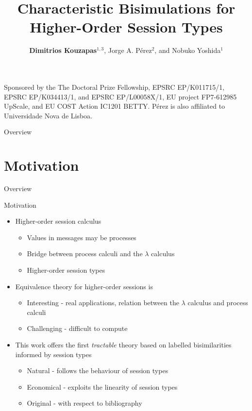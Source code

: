 \documentclass{beamer}
\title{Characteristic Bisimulations for Higher-Order Session Types}
\author{{\bf Dimitrios Kouzapas$^{1,3}$}, Jorge A. P\'{e}rez$^{2}$, and Nobuko Yoshida$^1$}
\institute{Imperial College London$^1$, University of Groningen$^2$, University of Glasgow$^3$}
\date
\newcommand{\currentsection}{
	\begin{frame}{Overview}
		\tableofcontents[currentsection]
	\end{frame}
}
\begin{document}
	\begin{frame}
		\titlepage

		{ \tiny %
		Sponsored by the The Doctoral Prize Fellowship, EPSRC EP/K011715/1,
		EPSRC EP/K034413/1, and EPSRC EP/L00058X/1,
		EU project FP7-612985 UpScale, and EU COST Action IC1201 BETTY.  
		P\'{e}rez is  also affiliated to
		Universidade Nova de Lisboa.%
		}
	\end{frame}

	\begin{frame}{Overview}
		\tableofcontents
	\end{frame}

	\section{Motivation}

	\currentsection

	\begin{frame}{Motivation}
		\begin{itemize}
			\item	Higher-order session calculus

				\begin{itemize}
					\item	Values in messages may be processes
					\item	Bridge between process calculi and the $\lambda$ calculus
					\item	Higher-order session types
				\end{itemize}


			\item	Equivalence theory for higher-order sessions is
				\begin{itemize}
					\item	Interesting - real applications, relation between the $\lambda$ calculus and process calculi
					\item	Challenging - difficult to compute
				\end{itemize}

			\item	This work offers the first {\em tractable} theory based on labelled bisimilarities
				informed by session types %
				\begin{itemize}
					\item	Natural - follows the behaviour of session types
					\item	Economical - exploits the linearity of session types
					\item	Original - with respect to bibliography
				\end{itemize}
		\end{itemize}
	\end{frame}
\end{document}
